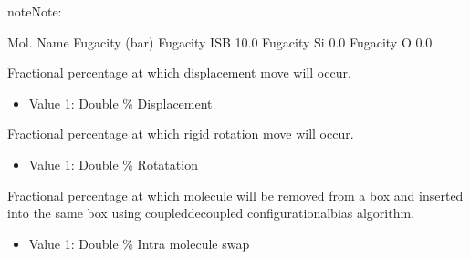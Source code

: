 \documentclass[letterpaper,10pt,english]{sphinxmanual}
\begin{document}
\begin{description}
\begin{sphinxadmonition}{note}{Note:}
\begin{itemize}
\end{itemize}
\end{sphinxadmonition}

\begin{sphinxVerbatim}[commandchars=\\\{\}]
\PYGZsh{}\PYGZsh{}\PYGZsh{}\PYGZsh{}\PYGZsh{}\PYGZsh{}\PYGZsh{}\PYGZsh{}\PYGZsh{}\PYGZsh{}\PYGZsh{}\PYGZsh{}\PYGZsh{}\PYGZsh{}\PYGZsh{}\PYGZsh{}\PYGZsh{}\PYGZsh{}\PYGZsh{}\PYGZsh{}\PYGZsh{}\PYGZsh{}\PYGZsh{}\PYGZsh{}\PYGZsh{}\PYGZsh{}\PYGZsh{}\PYGZsh{}\PYGZsh{}\PYGZsh{}\PYGZsh{}\PYGZsh{}\PYGZsh{}
\PYGZsh{} Mol.  Name Fugacity (bar)
\PYGZsh{}\PYGZsh{}\PYGZsh{}\PYGZsh{}\PYGZsh{}\PYGZsh{}\PYGZsh{}\PYGZsh{}\PYGZsh{}\PYGZsh{}\PYGZsh{}\PYGZsh{}\PYGZsh{}\PYGZsh{}\PYGZsh{}\PYGZsh{}\PYGZsh{}\PYGZsh{}\PYGZsh{}\PYGZsh{}\PYGZsh{}\PYGZsh{}\PYGZsh{}\PYGZsh{}\PYGZsh{}\PYGZsh{}\PYGZsh{}\PYGZsh{}\PYGZsh{}\PYGZsh{}\PYGZsh{}\PYGZsh{}\PYGZsh{}
Fugacity  ISB   10.0
Fugacity  Si     0.0
Fugacity  O      0.0
\end{sphinxVerbatim}

\item[{\sphinxcode{\sphinxupquote{DisFreq}}}] \leavevmode
\sphinxAtStartPar
Fractional percentage at which displacement move will occur.
\begin{itemize}
\item {} 
\sphinxAtStartPar
Value 1: Double \sphinxhyphen{} \% Displacement

\end{itemize}

\item[{\sphinxcode{\sphinxupquote{RotFreq}}}] \leavevmode
\sphinxAtStartPar
Fractional percentage at which rigid rotation move will occur.
\begin{itemize}
\item {} 
\sphinxAtStartPar
Value 1: Double \sphinxhyphen{} \% Rotatation

\end{itemize}

\item[{\sphinxcode{\sphinxupquote{IntraSwapFreq}}}] \leavevmode
\sphinxAtStartPar
Fractional percentage at which molecule will be removed from a box and inserted into the same box using coupled\sphinxhyphen{}decoupled configurational\sphinxhyphen{}bias algorithm.
\begin{itemize}
\item {} 
\sphinxAtStartPar
Value 1: Double \sphinxhyphen{} \% Intra molecule swap

\end{itemize}


\end{description}
\end{document}
